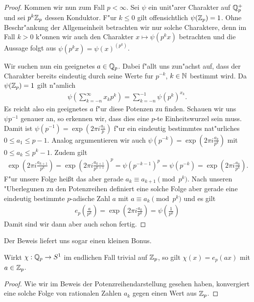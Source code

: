 \begin{proof}
			Kommen wir nun zum Fall $p<\infty$. 
			Sei $\psi$ ein unit"arer Charakter auf $\mathbb{Q}_p^+$ und sei $p^k{\mathbb{Z}_p}$ dessen Konduktor.
			F"ur $k\leq0$ gilt offensichtlich $\psi({\mathbb{Z}_p})=1$.
			Ohne Beschr"ankung der Allgemeinheit betrachten wir nur solche Charaktere, denn im Fall $k>0$ k"onnen wir auch den Charakter $x\mapsto \psi(p^kx)$ betrachten und die Aussage folgt aus $\psi(p^kx) = \psi(x)^{(p^k)}$.
			
			Wir suchen nun ein geeignetes $a\in{\mathbb{Q}_p}$. 
			Dabei f"allt uns zun"achst auf, dass der Charakter bereits eindeutig durch seine Werte fur $p^{-k}$, $k \in \mathbb{N}$ bestimmt wird.
			Da $\psi({\mathbb{Z}_p})=1$ gilt n"amlich
			\begin{align*}
				\psi \left( \sum_{k=-n}^\infty x_k p^k \right) = \sum_{k=-n}^{-1} \psi \left(p^k \right)^{x_k}.
			\end{align*}
			Es reicht also ein geeignetes $a$ f"ur diese Potenzen zu finden.
			Schauen wir uns $\psi{p^{-1}}$ genauer an, so erkennen wir, dass dies eine $p$-te Einheitswurzel sein muss.
			Damit ist $\psi(p^{-1}) = \exp(2\pi i \frac{a_1}{p})$ f"ur ein eindeutig bestimmtes nat"urliches $0\leq a_1 \leq p - 1$.
			Analog argumentieren wir auch $\psi(p^{-k}) = \exp(2\pi i \frac{a_k}{p^k})$ mit $0\leq a_k \leq p^k - 1$.
			Zudem gilt 
			\begin{align*}
				\exp\left(2\pi i \frac{a_{k+1}}{p^{k}}\right) = \exp\left(2\pi i \frac{a_{k+1}}{p^{k+1}}\right)^{p}= \psi(p^{-k-1})^p = \psi(p^{-k}) = \exp\left(2\pi i \frac{a_k}{p^k}\right).
			\end{align*}
			F"ur unsere Folge heißt das aber gerade $a_k \equiv a_{k+1} \pmod{p^k}$.
			Nach unseren "Uberlegunen zu den Potenzreihen definiert eine solche Folge aber gerade eine eindeutig bestimmte $p$-adische Zahl $a$ mit $a \equiv a_k \pmod{p^k}$ und es gilt
			\begin{align*}
				e_p\left( \frac{a}{p^{k}} \right) = \exp\left( 2\pi i \frac{a_k}{p^k} \right) = \psi \left( \frac{1}{p^k} \right)
			\end{align*}
			Damit sind wir dann aber auch schon fertig.
		\end{proof}
		Der Beweis liefert uns sogar einen kleinen Bonus.
		\begin{korollar}\label{kor:lokal:charTrivialZp}
			Wirkt $\chi:{\mathbb{Q}_p}\to S^1$ im endlichen Fall trivial auf ${\mathbb{Z}_p}$, so gilt $\chi(x) = e_p(ax)$ mit $a\in {\mathbb{Z}_p}$.
		\end{korollar}
		\begin{proof}
			Wie wir im Beweis der Potenzreihendarstellung gesehen haben, konvergiert eine solche Folge von rationalen Zahlen $a_k$ gegen einen Wert aus ${\mathbb{Z}_p}$.
		\end{proof}
